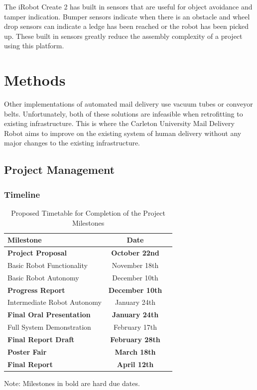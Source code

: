 \documentclass[12pt]{report}
\begin{document}
The iRobot Create 2 has built in sensors that are useful for object avoidance and tamper indication. Bumper sensors indicate when there is an obstacle and wheel drop sensors can indicate a ledge has been reached or the robot has been picked up. These built in sensors greatly reduce the assembly complexity of a project using this platform.
\chapter{Methods}
 Other implementations of automated mail delivery use vacuum tubes or conveyor belts. Unfortunately, both of these solutions are infeasible when retrofitting to existing infrastructure. This is where the Carleton University Mail Delivery Robot aims to improve on the existing system of human delivery without any major changes to the existing infrastructure.
\section{Project Management}
\subsection{Timeline}
\begin{table}[H]
\centering
\caption{Proposed Timetable for Completion of the Project Milestones}
\centering
\begin{tabular}[t]{lcc}
\toprule
Milestone&Date\\
\midrule
\textbf{Project Proposal}&\textbf{October 22nd}\\
Basic Robot Functionality&November 18th\\
Basic Robot Autonomy&December 10th\\ 
\textbf{Progress Report}&\textbf{December 10th}\\
Intermediate Robot Autonomy&January 24th\\
\textbf{Final Oral Presentation}&\textbf{January 24th}\\
Full System Demonstration&February 17th\\
\textbf{Final Report Draft}&\textbf{February 28th}\\
\textbf{Poster Fair}&\textbf{March 18th}\\
\textbf{Final Report}&\textbf{April 12th}\\
\bottomrule
\end{tabular}
\begin{tablenotes}
      \small
      \centering
      \item Note: Milestones in bold are hard due dates.
\end{tablenotes}
\end{table}%
\end{document}
